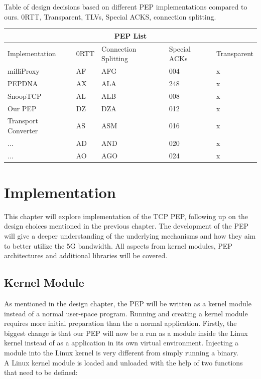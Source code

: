 \documentclass[a4paper,english, 11pt]{report}
\begin{document}
{Table of design decisions based on different PEP implementations compared to ours.}
{0RTT, Transparent, TLVs, Special ACKS, connection splitting.}\\
\begin{tabular}{ |p{4cm}||p{2cm}|p{2cm}|p{2cm}|p{2cm}| }
 \hline
 \multicolumn{5}{|c|}{PEP List} \\
 \hline
 Implementation& 0RTT &Connection Splitting &Special ACKs &Transparent\\
 \hline
 milliProxy   & AF    &AFG&   004 & x\\
 PEPDNA&   AX  & ALA   &248 & x\\
 SnoopTCP &AL & ALB&  008 & x\\
 Our PEP    &DZ & DZA&  012& x \\
 Transport Converter &   AS  & ASM&016& x\\
 ...& AD  & AND   &020& x\\
 ...& AO  & AGO&024& x\\
 \hline
\end{tabular}

\chapter{Implementation}
This chapter will explore implementation of the TCP PEP, following up on the design choices mentioned in the previous chapter. The development of the PEP will give a deeper understanding of the underlying mechanisms and how they aim to better utilize the 5G bandwidth. All aspects from kernel modules, PEP architectures and additional libraries will be covered.

\section{Kernel Module}
As mentioned in the design chapter, the PEP will be written as a kernel module instead of a normal user-space program. Running and creating a kernel module requires more initial preparation than the a normal application. Firstly, the biggest change is that our PEP will now be a run as a module inside the Linux kernel instead of as a application in its own virtual environment. Injecting a module into the Linux kernel is very different from simply running a binary.\\

A Linux kernel module is loaded and unloaded with the help of two functions that need to be defined:\\
\end{document}
